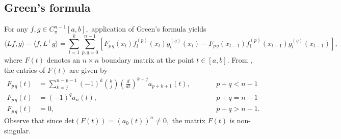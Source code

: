 \documentclass[10pt,reqno,oneside,a4paper]{article}
\begin{document}
\subsection{Green's formula}
For any $f,g \in C^{n-1}_{\pi}[a,b],$ application of Green's formula yields
\[ \langle Lf,g\rangle - \langle f,L^+ g\rangle = \sum_{l=1}^{k}\sum_{p,q=0}^{n-1}[F_{p\,q}(x_l) f_l^{(p)}(x_l)g_l^{(q)}(x_l) - F_{p\,q}(x_{l-1})f_l^{(p)}(x_{l-1})g_l^{(q)}(x_{l-1})], \]
where $F(t)$ denotes an $n\times n$ boundary matrix at the point $t \in [a,b].$ From \cite[p. 1286]{dunford}, the entries of $F(t)$ are given by
\begin{equation*}
\begin{aligned}
F_{p\,q}(t) &= \sum^{n-p-1}_{k = j} (-1)^k \binom{k}{j} \left( \frac{d}{dt}\right)^{k-j} a_{p+k+1}(t), &&\qquad p + q< n - 1\\
F_{p\,q}(t) &= (-1)^q  a_{n}(t), &&\qquad p + q= n - 1\\
F_{p\,q}(t) &= 0, &&\qquad p + q > n - 1.
\end{aligned}
\end{equation*}
Observe that since $\mathrm{det}\left(F(t)\right) = (a_0(t))^n \neq 0,$ the matrix $F(t)$ is non-singular. 
\end{document}
